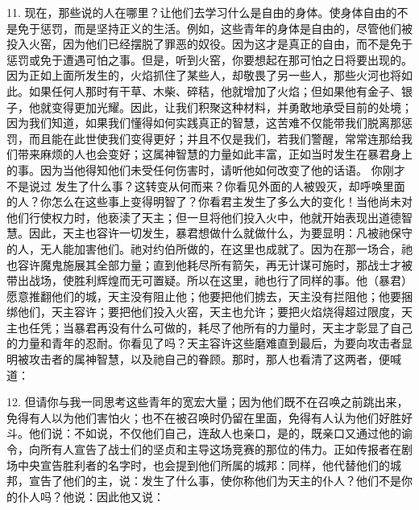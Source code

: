11. 现在，那些说的人在哪里？让他们去学习什么是自由的身体。使身体自由的不是免于惩罚，而是坚持正义的生活。例如，这些青年的身体是自由的，尽管他们被投入火窑，因为他们已经摆脱了罪恶的奴役。因为这才是真正的自由，而不是免于惩罚或免于遭遇可怕之事。但是，听到火窑，你要想起在那可怕之日将要出现的。因为正如上面所发生的，火焰抓住了某些人，却敬畏了另一些人，那些火河也将如此。如果任何人那时有干草、木柴、碎秸，他就增加了火焰；但如果他有金子、银子，他就变得更加光耀。因此，让我们积聚这种材料，并勇敢地承受目前的处境；因为我们知道，如果我们懂得如何实践真正的智慧，这苦难不仅能带我们脱离那惩罚，而且能在此世使我们变得更好；并且不仅是我们，若我们警醒，常常连那给我们带来麻烦的人也会变好；这属神智慧的力量如此丰富，正如当时发生在暴君身上的事。因为当他得知他们未受任何伤害时，请听他如何改变了他的话语。 \newline{}你刚才不是说过 \newline{}发生了什么事？这转变从何而来？你看见外面的人被毁灭，却呼唤里面的人？你怎么在这些事上变得明智了？你看君主发生了多么大的变化！当他尚未对他们行使权力时，他亵渎了天主；但一旦将他们投入火中，他就开始表现出道德智慧。因此，天主也容许一切发生，暴君想做什么就做什么，为要显明：凡被祂保守的人，无人能加害他们。祂对约伯所做的，在这里也成就了。因为在那一场合，祂也容许魔鬼施展其全部力量；直到他耗尽所有箭矢，再无计谋可施时，那战士才被带出战场，使胜利辉煌而无可置疑。所以在这里，祂也行了同样的事。他（暴君）愿意推翻他们的城，天主没有阻止他；他要把他们掳去，天主没有拦阻他；他要捆绑他们，天主容许；要把他们投入火窑，天主也允许；要把火焰烧得超过限度，天主也任凭；当暴君再没有什么可做的，耗尽了他所有的力量时，天主才彰显了自己的力量和青年的忍耐。你看见了吗？天主容许这些磨难直到最后，为要向攻击者显明被攻击者的属神智慧，以及祂自己的眷顾。那时，那人也看清了这两者，便喊道：\par

12. 但请你与我一同思考这些青年的宽宏大量；因为他们既不在召唤之前跳出来，免得有人以为他们害怕火；也不在被召唤时仍留在里面，免得有人认为他们好胜好斗。他们说：不如说，不仅他们自己，连敌人也亲口，是的，既亲口又通过他的谕令，向所有人宣告了战士们的坚贞和主导这场竞赛的那位的伟力。正如传报者在剧场中央宣告胜利者的名字时，也会提到他们所属的城邦：同样，他代替他们的城邦，宣告了他们的主，说：发生了什么事，使你称他们为天主的仆人？他们不是你的仆人吗？他说：因此他又说：\par

